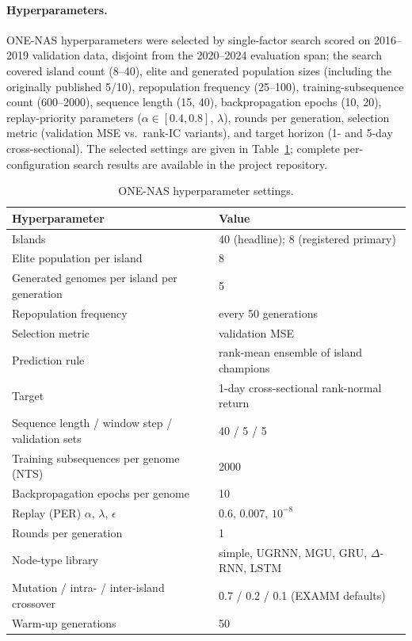 \documentclass[11pt]{article}
\begin{document}
\paragraph{Hyperparameters.}
ONE-NAS hyperparameters were selected by single-factor search scored on
2016--2019 validation data, disjoint from the 2020--2024 evaluation span;
the search covered island count (8--40), elite and generated population
sizes (including the originally published 5/10), repopulation frequency
(25--100), training-subsequence count (600--2000), sequence length (15,
40), backpropagation epochs (10, 20), replay-priority parameters
($\alpha \in [0.4, 0.8]$, $\lambda$), rounds per generation, selection
metric (validation MSE vs.\ rank-IC variants), and target horizon (1- and
5-day cross-sectional). The selected settings are given in
Table~\ref{tab:hps}; complete per-configuration search results are
available in the project repository.

\begin{table}[h]
\centering
\caption{ONE-NAS hyperparameter settings.}
\label{tab:hps}
\begin{tabular}{ll}
\toprule
Hyperparameter & Value \\
\midrule
Islands & 40 (headline); 8 (registered primary) \\
Elite population per island & 8 \\
Generated genomes per island per generation & 5 \\
Repopulation frequency & every 50 generations \\
Selection metric & validation MSE \\
Prediction rule & rank-mean ensemble of island champions \\
Target & 1-day cross-sectional rank-normal return \\
Sequence length / window step / validation sets & 40 / 5 / 5 \\
Training subsequences per genome (NTS) & 2000 \\
Backpropagation epochs per genome & 10 \\
Replay (PER) $\alpha$, $\lambda$, $\epsilon$ & 0.6, 0.007, $10^{-8}$ \\
Rounds per generation & 1 \\
Node-type library & simple, UGRNN, MGU, GRU, $\Delta$-RNN, LSTM \\
Mutation / intra- / inter-island crossover & 0.7 / 0.2 / 0.1 (EXAMM defaults) \\
Warm-up generations & 50 \\
\bottomrule
\end{tabular}
\end{table}
\end{document}
